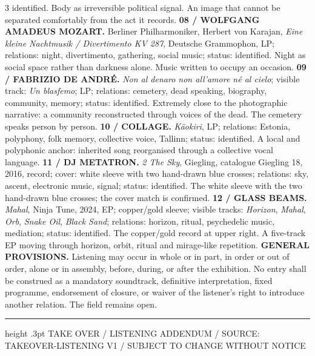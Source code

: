 \documentclass[10pt]{article}
\begin{document}
\begin{minipage}{190mm}
{\begin{multicols}{3}
identified. Body as irreversible political signal. An image that cannot be separated comfortably from the act it records. \textbf{08 / WOLFGANG AMADEUS MOZART.} Berliner Philharmoniker, Herbert von Karajan, \emph{Eine kleine Nachtmusik / Divertimento KV 287}, Deutsche Grammophon, LP; relations: night, divertimento, gathering, social music; status: identified. Night as social space rather than darkness alone. Music written to occupy an occasion. \textbf{09 / FABRIZIO DE ANDR\'E.} \emph{Non al denaro non all'amore n\'e al cielo}; visible track: \emph{Un blasfemo}; LP; relations: cemetery, dead speaking, biography, community, memory; status: identified. Extremely close to the photographic narrative: a community reconstructed through voices of the dead. The cemetery speaks person by person. \textbf{10 / COLLAGE.} \emph{K\"aokiri}, LP; relations: Estonia, polyphony, folk memory, collective voice, Tallinn; status: identified. A local and polyphonic anchor: inherited song reorganised through a collective vocal language. \textbf{11 / DJ METATRON.} \emph{2 The Sky}, Giegling, catalogue Giegling 18, 2016, record; cover: white sleeve with two hand-drawn blue crosses; relations: sky, ascent, electronic music, signal; status: identified. The white sleeve with the two hand-drawn blue crosses; the cover match is confirmed. \textbf{12 / GLASS BEAMS.} \emph{Mahal}, Ninja Tune, 2024, EP; copper/gold sleeve; visible tracks: \emph{Horizon}, \emph{Mahal}, \emph{Orb}, \emph{Snake Oil}, \emph{Black Sand}; relations: horizon, ritual, psychedelic music, mediation; status: identified. The copper/gold record at upper right. A five-track EP moving through horizon, orbit, ritual and mirage-like repetition. \textbf{GENERAL PROVISIONS.} Listening may occur in whole or in part, in order or out of order, alone or in assembly, before, during, or after the exhibition. No entry shall be construed as a mandatory soundtrack, definitive interpretation, fixed programme, endorsement of closure, or waiver of the listener's right to introduce another relation. The field remains open.
  \end{multicols}}
  \vfill
  \hrule height .3pt
  \vspace{2mm}
  {\metafont\fontsize{5.5}{6.5}\selectfont TAKE OVER / LISTENING ADDENDUM / SOURCE: TAKEOVER-LISTENING V1 / SUBJECT TO CHANGE WITHOUT NOTICE}
\end{minipage}
\end{document}
